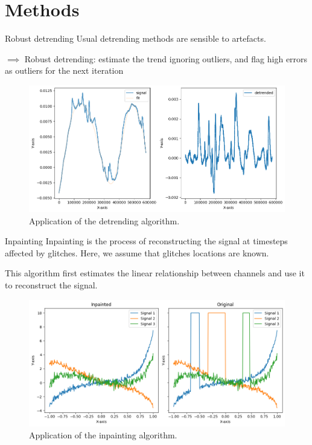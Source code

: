 \documentclass[10pt,serif]{beamer}
\begin{document}
\section[\color{white} Methods]{Methods}\label{sec:methods}

\begin{frame}{Robust detrending}
    Usual detrending methods are sensible to artefacts.

    $\implies$ Robust detrending: estimate the trend ignoring outliers, and flag high errors as outliers for the next iteration
    \begin{figure}
        \centering
        \includegraphics[width=.8\textwidth]{figures/detrend_real.png}
        \caption{Application of the detrending algorithm.}
        \label{fig:data}
    \end{figure}
\end{frame}

\begin{frame}{Inpainting}
    Inpainting is the process of reconstructing the signal at timesteps affected by glitches. Here, we assume that glitches locations are known.

    This algorithm first estimates the linear relationship between channels and use it to reconstruct the signal.
    \begin{figure}
        \centering
        \includegraphics[width=.7\textwidth]{figures/inpaint.png}
        \caption{Application of the inpainting algorithm.}
        \label{fig:data}
    \end{figure}
\end{frame}
\end{document}

